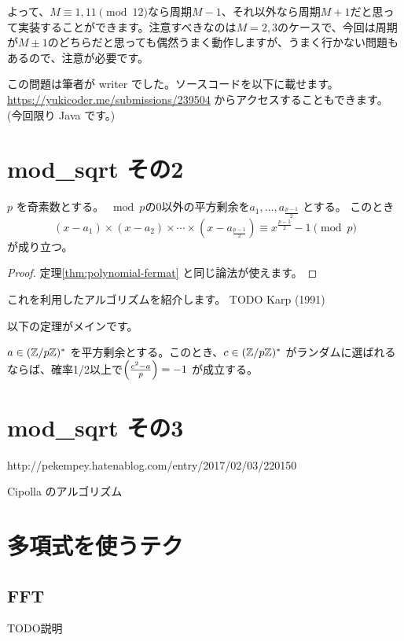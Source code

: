 \documentclass{jsarticle}
\begin{document}
  よって、$M \equiv 1, 11 \pmod{12}$なら周期$M-1$、それ以外なら周期$M + 1$だと思って実装することができます。注意すべきなのは$M = 2,3$のケースで、今回は周期が$M \pm 1$のどちらだと思っても偶然うまく動作しますが、うまく行かない問題もあるので、注意が必要です。

  この問題は筆者が writer でした。ソースコードを以下に載せます。\url{https://yukicoder.me/submissions/239504} からアクセスすることもできます。 (今回限り Java です。)
  
 \section{mod\_sqrt その2}
 \label{sec:karp-mod-sqrt}
 \begin{theorem}
  $p$ を奇素数とする。
  ${} \bmod p$の0以外の平方剰余を$a_1, \ldots, a_{\frac{p-1}{2}}$ とする。
  このとき
  \begin{displaymath}
   (x - a_1) \times (x - a_2) \times \cdots \times (x - a_{\frac{p-1}{2}})
   \equiv x^{\frac{p-1}{2}}-1 \pmod p
  \end{displaymath}
  が成り立つ。
 \end{theorem}
 \begin{proof}
  定理\ref{thm:polynomial-fermat} と同じ論法が使えます。
 \end{proof}
 これを利用したアルゴリズムを紹介します。 TODO Karp (1991)~\cite{Karp1991}

 以下の定理がメインです。
 \begin{theorem}
  $a \in (\mathbb{Z}/p\mathbb{Z})^*$ を平方剰余とする。このとき、$c \in (\mathbb{Z}/p\mathbb{Z})^*$ がランダムに選ばれるならば、確率1/2以上で$\left(\frac{c^2-a}{p}\right) = -1$ が成立する。
 \end{theorem}
 \section{mod\_sqrt その3}
 http://pekempey.hatenablog.com/entry/2017/02/03/220150

 Cipolla のアルゴリズム
 \section{多項式を使うテク}
 \label{sec:technique-using-polynomials}
  \subsection{FFT}
  TODO説明
\end{document}
